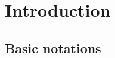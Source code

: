 \documentclass[a4paper,oneside,11pt,bibliography=totoc]{scrartcl}
\theoremstyle{plain}
\theoremstyle{remark}
\theoremstyle{definition}
\begin{document}
\tableofcontents





\renewcommand{\thefootnote}{\arabic{footnote}}
%
\setlength{\parindent}{12 pt}




\section{Introduction}

\subsection{Basic notations}\label{BasicNotations}
\end{document}
